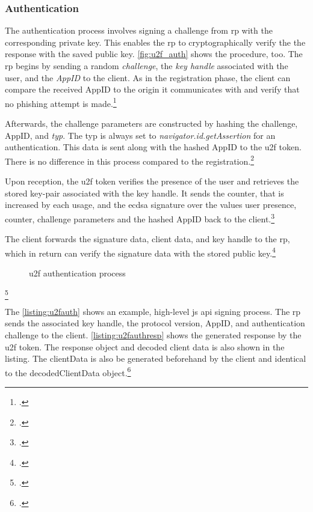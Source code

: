 \subsubsection{Authentication}

The authentication process involves signing a challenge from \gls{rp} with the corresponding private key. This enables the \gls{rp} to cryptographically verify the the response with the saved public key. \autoref{fig:u2f_auth} shows the procedure, too. The \gls{rp} begins by sending a random \textit{challenge}, the \textit{key handle} associated with the user, and the \textit{AppID} to the client. As in the registration phase, the client can compare the received AppID to the origin it communicates with and verify that no phishing attempt is made.\footcites[See][3]{7860546}[See][6]{u2f-js-api}

Afterwards, the challenge parameters are constructed by hashing the challenge, AppID, and \textit{typ}. The typ is always set to \textit{navigator.id.getAssertion} for an authentication. This data is sent along with the hashed AppID to the \gls{u2f} token. There is no difference in this process compared to the registration.\footcites[See][6]{u2f-raw-message}

Upon reception, the \gls{u2f} token verifies the presence of the user and retrieves the stored key-pair associated with the key handle. It sends the counter, that is increased by each usage, and the \gls{ecdsa} signature over the values user presence, counter, challenge parameters and the hashed AppID back to the client.\footcites[431]{10.1007/978-3-662-54970-4_25}[See][7]{u2f-raw-message}

The client forwards the signature data, client data, and key handle to the \gls{rp}, which in return can verify the signature data with the stored public key.\footcites[See][118]{IdentityandDataSecurityforWebDevelopment}

\begin{figure}[hbt]
	\centering
	
	\caption[\gls{u2f} authentication process]{\gls{u2f} authentication process\footnotemark}
	\label{fig:u2f_auth}
\end{figure}
\footcitetexts[Source: diagram by author, based on][70]{10.1007/978-3-319-75650-9_5}[][428]{10.1007/978-3-662-54970-4_25}

The \autoref{listing:u2fauth} shows an example, high-level \gls{js} \gls{api} signing process. The \gls{rp} sends the associated key handle, the protocol version, AppID, and authentication challenge to the client. \autoref{listing:u2fauthresp} shows the generated response by the \gls{u2f} token. The response object and decoded client data is also shown in the listing. The clientData is also be generated beforehand by the client and identical to the decodedClientData object.\footcites[See][3]{u2f-js-api}

